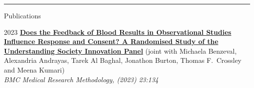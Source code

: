 \documentclass[5pt,a4paper]{article}
\begin{document}
\begin{cv}{}
\hrule
\begin{cvlist}{Publications}
\item[\small 2023] 
\href{https://bmcmedresmethodol.biomedcentral.com/articles/10.1186/s12874-023-01948-y}{\textbf{Does the Feedback of Blood Results in Observational Studies Influence Response and Consent? A Randomised Study of the Understanding Society Innovation Panel}} (joint with Michaela Benzeval, Alexandria Andrayas, Tarek Al Baghal, Jonathon Burton, Thomas F.\ Crossley and Meena Kumari)\\ \textit{BMC Medical Research Methodology, (2023) 23:134}\\
\begin{comment}    
    \footnotesize \textbf{Background}: While medical studies generally provide health feedback to participants, in observational studies this is not always the case due to logistical and financial difficulties, or concerns about changing observed behaviours. However, evidence suggests that lack of feedback may deter participants from providing biological samples. This paper investigates the effect of offering feedback of blood results on participation in biomeasure sample collection.
    \textbf{Methods}: Participants aged 16 and over from a longitudinal study – the Understanding Society Innovation Panel - were randomised to three arms – nurse interviewer, interviewer, web survey – and invited to participate in biomeasures data collection. Within each arm they were randomised to receive feedback of their blood results or not. For those interviewed by a nurse both venous and dried blood samples (DBS) were taken in the interview. For the other two arms, they were asked if they would be willing to take a sample, and if they agreed a DBS kit was left or sent to them so the participant could take their own sample and return it. Blood samples were analysed and, if in the feedback arms, participants were sent their total cholesterol and HbA1c results. Response rates for feedback and non-feedback groups were compared: overall; in each arm of the study; by socio-demographic and health characteristics; and by previous study participation. Logistic regression models of providing a blood sample by feedback group and data collection approach controlling for confounders were calculated.
    \textbf{Results}: Overall 2162 (80.3\% of individuals in responding households) took part in the survey; of those 1053 (48.7\%) consented to provide a blood sample. Being offered feedback had little effect on overall participation but did increase consent to provide a blood sample (unadjusted OR 1.38; CI: 1.16–1.64). Controlling for participant characteristics, the effect of feedback was highest among web participants (1.55; 1.11–2.17), followed by interview participants (1.35; 0.99 –1.84) and then nurse interview participants (1.30; 0.89–1.92).
    

\end{comment}
\end{cvlist}
\end{cv}
\end{document}

